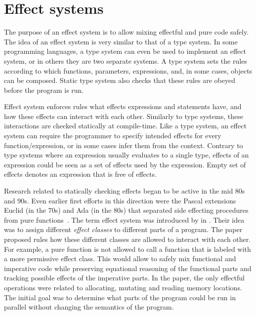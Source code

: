 \section{Effect systems}\label{effects:effect-systems}
The purpose of an effect system is to allow mixing effectful and pure code safely. The idea of an effect system is very similar to that of a type system. In some programming languages, a type system can even be used to implement an effect system, or in others they are two separate systems. A type system sets the rules according to which functions, parameters, expressions, and, in some cases, objects can be composed. Static type system also checks that these rules are obeyed before the program is run.

Effect system enforces rules what effects expressions and statements have, and how these effects can interact with each other. Similarly to type systems, these interactions are checked statically at compile-time. Like a type system, an effect system can require the programmer to specify intended effects for every function/expression, or in some cases infer them from the context. Contrary to type systems where an expression usually evaluates to a single type, effects of an expression could be seen as a set of effects used by the expression. Empty set of effects denotes an expression that is free of effects.

Research related to statically checking effects began to be active in the mid 80s and 90s. Even earlier first efforts in this direction were the Pascal extensions Euclid (in the 70s) and Ada (in the 80s) that separated side effecting procedures from pure functions~\cite{real-prog-in-fp}. The term effect system was introduced by \textcite{intgr-fp-ip} in \citeyear{intgr-fp-ip}. Their idea was to assign different \textit{effect classes} to different parts of a program. The paper proposed rules how these different classes are allowed to interact with each other. For example, a pure function is not allowed to call a function that is labeled with a more permissive effect class. This would allow to safely mix functional and imperative code while preserving equational reasoning of the functional parts and tracking possible effects of the imperative parts. In the paper, the only effectful operations were related to allocating, mutating and reading memory locations. The initial goal was to determine what parts of the program could be run in parallel without changing the semantics of the program.

